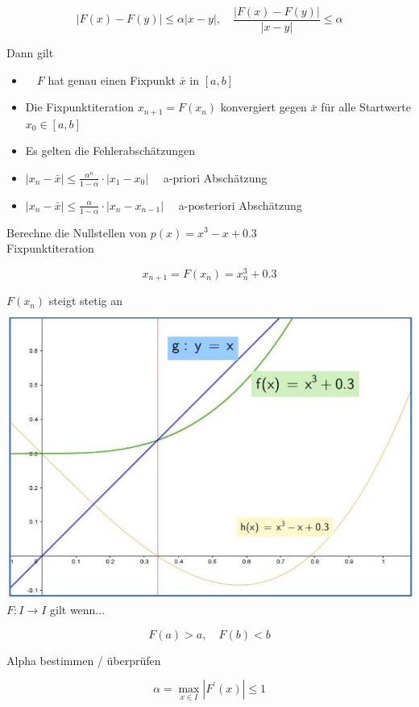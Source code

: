 $$
|F(x)-F(y)| \leq \alpha|x-y|, \quad \frac{|F(x)-F(y)|}{|x-y|} \leq \alpha
$$

Dann gilt

\begin{itemize}
  \item $\quad F$ hat genau einen Fixpunkt $\bar{x}$ in $[a, b]$
  \item Die Fixpunktiteration $x_{n+1}=F\left(x_{n}\right)$ konvergiert gegen $\bar{x}$ für alle Startwerte $x_{0} \in[a, b]$
  \item Es gelten die Fehlerabschätzungen
  \item $\left|x_{n}-\bar{x}\right| \leq \frac{\alpha^{n}}{1-\alpha} \cdot\left|x_{1}-x_{0}\right| \quad$ a-priori Abschätzung
  \item $\left|x_{n}-\bar{x}\right| \leq \frac{\alpha}{1-\alpha} \cdot\left|x_{n}-x_{n-1}\right| \quad$ a-posteriori Abschätzung
\end{itemize}

Berechne die Nullstellen von $p(x)=x^{3}-x+0.3$\\
Fixpunktiteration

$$
x_{n+1}=F\left(x_{n}\right)=x_{n}^{3}+0.3
$$

$F\left(x_{n}\right)$ steigt stetig an\\
\includegraphics[width=\linewidth]{images/2024_12_29_68ccba06d0091c162fa4g-02}\\
$F: I \rightarrow I$ gilt wenn...

$$
F(a)>a, \quad F(b)<b
$$

Alpha bestimmen / überprüfen

$$
\alpha=\max _{x \in I}\left|F^{\prime}(x)\right| \leq 1
$$


